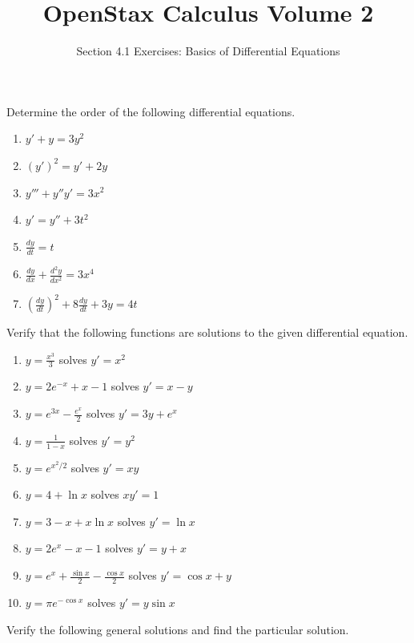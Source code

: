 \documentclass{exercises}
\title{OpenStax Calculus Volume 2}
\subtitle{Section 4.1 Exercises: Basics of Differential Equations}
\author{}
\date{}
\begin{document}
\maketitle


Determine the order of the following differential equations.

\begin{enumerate}[start=1]
\item $y'+y=3y^{2}$
\item ${(y')}^{2}=y'+2y$
\item $y'''+y''y'=3x^{2}$
\item $y'=y''+3t^{2}$
\item $\frac{dy}{dt}=t$
\item $\frac{dy}{dx}+\frac{d^{2}y}{dx^{2}}=3x^{4}$
\item ${(\frac{dy}{dt})}^{2}+8\frac{dy}{dt}+3y=4t$
\end{enumerate}

Verify that the following functions are solutions to the given differential equation.

\begin{enumerate}[resume]
\item $y=\frac{x^{3}}{3}$ solves $y'=x^{2}$
\item $y=2e^{-x}+x-1$ solves $y'=x-y$
\item $y=e^{3x}-\frac{e^{x}}{2}$ solves $y'=3y+e^{x}$
\item $y=\frac{1}{1-x}$ solves $y'=y^{2}$
\item $y=e^{x^{2}/2}$ solves $y'=xy$
\item $y=4+\ln x$ solves $xy'=1$
\item $y=3-x+x\ln x$ solves $y'=\ln x$
\item $y=2e^{x}-x-1$ solves $y'=y+x$
\item $y=e^{x}+\frac{\sin x}{2}-\frac{\cos x}{2}$ solves $y'=\cos x+y$
\item $y=\pi e^{-\cos x}$ solves $y'=y\sin x$
\end{enumerate}

Verify the following general solutions and find the particular solution.
\end{document}
